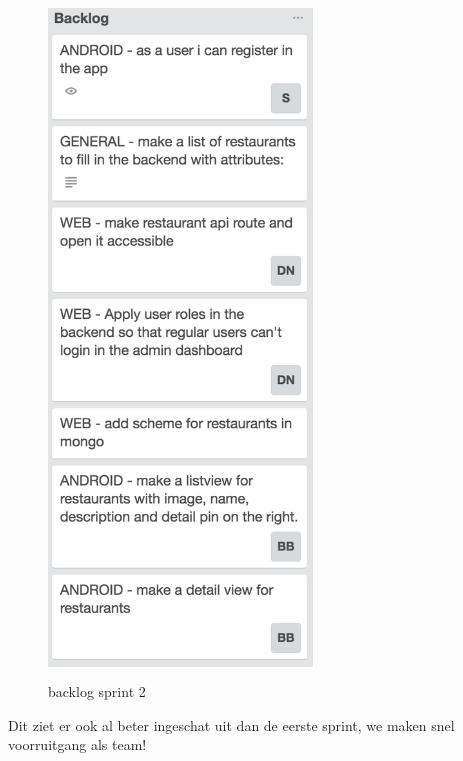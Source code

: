 \begin{figure}[H]
	\centering
\includegraphics[width=7cm,height=18cm]{img/backlog_week2.png}
\caption{backlog sprint 2}
\end{figure}

Dit ziet er ook al beter ingeschat uit dan de eerste sprint, we maken snel voorruitgang als team!

